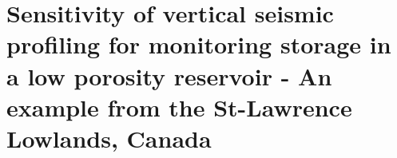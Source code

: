 \pagestyle{fancy}
\fancyhf{}
\renewcommand{\headrulewidth}{0pt}
\fancyhead[RO]{\thepage}
\fancyhead[LE]{\thepage}

\chapter{Sensitivity of vertical seismic profiling for monitoring
\texorpdfstring{}{CO2} storage in a low porosity reservoir - An example
from the St-Lawrence Lowlands, Canada}

\label{ch:article1}


